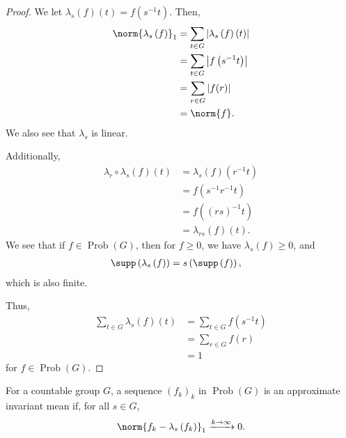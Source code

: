 \documentclass[10pt]{mypackage}
\DeclareMathOperator{\Prob}{Prob}
\begin{document}
\begin{proof}
  We let $\lambda_{s}\left(f\right)\left(t\right) = f\left(s^{-1}t\right)$. Then,
  \begin{align*}
    \norm{\lambda_s\left(f\right)}_{1} &= \sum_{t\in G}\left\vert \lambda_s\left(f\right)\left(t\right) \right\vert\\
                                       &= \sum_{t\in G}\left\vert f\left(s^{-1}t\right) \right\vert\\
                                       &= \sum_{r\in G}\left\vert f(r) \right\vert\\
                                       &= \norm{f}.
  \end{align*}
  We also see that $\lambda_s$ is linear.\newline

  Additionally,
  \begin{align*}
    \lambda_r\circ\lambda_s\left(f\right)\left(t\right) &= \lambda_s\left(f\right)\left(r^{-1}t\right)\\
                                                        &= f\left(s^{-1}r^{-1}t\right)\\
                                                        &= f\left(\left(rs\right)^{-1}t\right)\\
                                                        &= \lambda_{rs}\left(f\right)\left(t\right).
  \end{align*}
  We see that if $f\in \Prob(G)$, then for $f\geq 0$, we have $\lambda_s\left(f\right) \geq 0$, and
  \begin{align*}
    \supp\left(\lambda_s\left(f\right)\right) &= s\left(\supp\left(f\right)\right),
  \end{align*}
  which is also finite.\newline

  Thus, 
  \begin{align*}
    \sum_{t\in G}\lambda_s\left(f\right)\left(t\right) &= \sum_{t\in G}f\left(s^{-1}t\right)\\
                                                       &= \sum_{r\in G}f(r)\\
                                                       &= 1
  \end{align*}
  for $f\in \Prob(G)$.
\end{proof}
\begin{definition}
  For a countable group $G$, a sequence $\left(f_k\right)_k$ in $\Prob(G)$ is an approximate invariant mean if, for all $s\in G$,
  \begin{align*}
    \norm{f_k - \lambda_s\left(f_k\right)}_{1}\xrightarrow{k\rightarrow\infty}0.
  \end{align*}
\end{definition}
\end{document}
